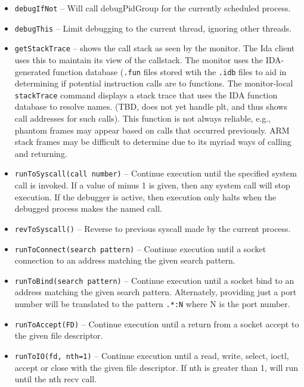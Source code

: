 \documentclass[titlepage]{article}
\begin{document}
\begin{itemize}
\item {\tt debugIfNot} -- Will call debugPidGroup for the currently scheduled process.

\item {\tt debugThis} -- Limit debugging to the current thread, ignoring other threads.

\item {\tt getStackTrace} – shows the call stack as seen by the monitor.  The Ida client uses this to maintain its view of the callstack.  The monitor
uses the IDA-generated function database ({\tt .fun} files stored wtih the {\tt .idb} files to aid in determining if 
potential instruction calls are to functions.  The monitor-local {\tt stackTrace} command displays a
stack trace that uses the IDA function database to resolve names.  (TBD, does not yet handle plt, and thus shows call addresses for such calls).
This function is not always reliable, e.g., phantom frames may appear based on calls that occurred previously. ARM stack frames may be
difficult to determine due to its myriad ways of calling and returning. 

\item {\tt runToSyscall(call number)} – Continue execution until the specified system call is invoked.  If a value of minus 1 is given, then any system call will stop execution.  If the debugger is active, then execution only halts when the debugged process makes the named call.

\item {\tt revToSyscall()} -- Reverse to previous syscall made by the current process.

\item {\tt runToConnect(search pattern)} – Continue execution until a socket connection to an address matching the given search pattern.

\item {\tt runToBind(search pattern)} – Continue execution until a socket bind to an address matching the given search pattern.  Alternately, providing just
a port number will be translated to the pattern {\tt .*:N} where N is the port number.

\item {\tt runToAccept(FD)} – Continue execution until a return from a socket accept to the given file descriptor.

\item {\tt runToIO(fd, nth=1)} – Continue execution until a read, write, select, ioctl, accept or close with the given file descriptor.  
If nth is greater than 1, will run until the nth recv call.  


\end{itemize}
\end{document}
